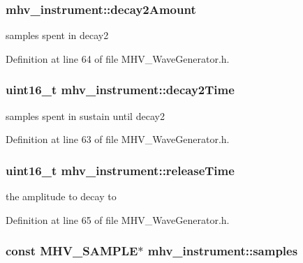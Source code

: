 \hypertarget{structmhv__instrument_a54b5eec4d485a7c096377290a2aa5456}{
\subsubsection[{decay2\-Amount}]{ mhv\-\_\-instrument\-::decay2\-Amount}}\label{structmhv__instrument_a54b5eec4d485a7c096377290a2aa5456}
samples spent in decay2 

Definition at line 64 of file M\-H\-V\-\_\-\-Wave\-Generator.\-h.

\hypertarget{structmhv__instrument_a68888a2d53929235d2e5379d46968325}{
\subsubsection[{decay2\-Time}]{\setlength{\rightskip}{0pt plus 5cm}uint16\-\_\-t mhv\-\_\-instrument\-::decay2\-Time}}\label{structmhv__instrument_a68888a2d53929235d2e5379d46968325}
samples spent in sustain until decay2 

Definition at line 63 of file M\-H\-V\-\_\-\-Wave\-Generator.\-h.

\hypertarget{structmhv__instrument_a376cf3d2ec80de657a1bc947f34eab55}{
\subsubsection[{release\-Time}]{\setlength{\rightskip}{0pt plus 5cm}uint16\-\_\-t mhv\-\_\-instrument\-::release\-Time}}\label{structmhv__instrument_a376cf3d2ec80de657a1bc947f34eab55}
the amplitude to decay to 

Definition at line 65 of file M\-H\-V\-\_\-\-Wave\-Generator.\-h.

\hypertarget{structmhv__instrument_a1a3dd705816f79c9f44da16743f38516}{
\subsubsection[{samples}]{\setlength{\rightskip}{0pt plus 5cm}const {\bf M\-H\-V\-\_\-\-S\-A\-M\-P\-L\-E}$\ast$ mhv\-\_\-instrument\-::samples}}\label{structmhv__instrument_a1a3dd705816f79c9f44da16743f38516}


